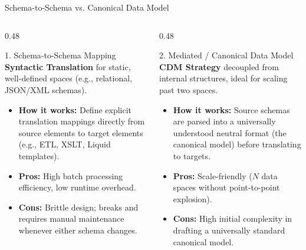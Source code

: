 \documentclass[aspectratio=169]{beamer}
\begin{document}
\begin{frame}{Schema-to-Schema vs. Canonical Data Model}
  \begin{columns}[t]
    \begin{column}{0.48\textwidth}
      \begin{block}{1. Schema-to-Schema Mapping}
        \scriptsize
        \textbf{Syntactic Translation} for static, well-defined spaces (e.g., relational, JSON/XML schemas).
        \vspace{0.5em}
        \begin{itemize}
          \item \textbf{How it works:} Define explicit translation mappings directly from source elements to target elements (e.g., ETL, XSLT, Liquid templates).
          \item \textbf{\textcolor{HMCMint}{Pros:}} High batch processing efficiency, low runtime overhead.
          \item \textbf{\textcolor{red!70}{Cons:}} Brittle design; breaks and requires manual maintenance whenever either schema changes.
        \end{itemize}
      \end{block}
    \end{column}
    
    \begin{column}{0.48\textwidth}
      \begin{block}{2. Mediated / Canonical Data Model}
        \scriptsize
        \textbf{CDM Strategy} decoupled from internal structures, ideal for scaling past two spaces.
        \vspace{0.5em}
        \begin{itemize}
          \item \textbf{How it works:} Source schemas are parsed into a universally understood neutral format (the canonical model) before translating to targets.
          \item \textbf{\textcolor{HMCMint}{Pros:}} Scale-friendly ($N$ data spaces without point-to-point explosion).
          \item \textbf{\textcolor{red!70}{Cons:}} High initial complexity in drafting a universally standard canonical model.
        \end{itemize}
      \end{block}
    \end{column}
  \end{columns}
\end{frame}
\end{document}
